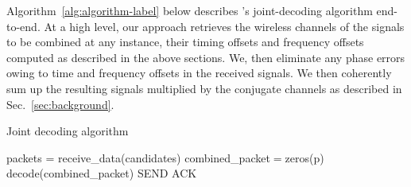  \vspace*{0.1in}

 Algorithm~\ref{alg:algorithm-label} below describes \name's joint-decoding algorithm end-to-end. At a high level, our approach retrieves the wireless channels of the signals to be combined at any instance, their timing offsets and frequency offsets computed as described in the above sections. We, then eliminate any phase errors owing to time and frequency offsets in the received signals. We then coherently sum up the resulting signals multiplied by the conjugate channels as described in Sec.~\ref{sec:background}. 




\LinesNumbered
\begin{algorithm}[ht]
\caption{Joint decoding algorithm}
\label{alg:algorithm-label}
 packets = receive\_data(candidates)\;
 combined\_packet$=$zeros(p)\;
 decode(combined\_packet)\;
 SEND ACK\;
 
 \end{algorithm}




